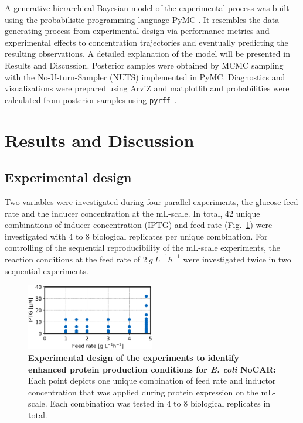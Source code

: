 \documentclass[sn-standardnature]{sn-jnl}%
\theoremstyle{thmstyleone}%
\theoremstyle{thmstyletwo}%
\theoremstyle{thmstylethree}%
\begin{document}
A generative hierarchical Bayesian model of the experimental process was built using the probabilistic programming language PyMC \cite{pymc3,pymcZenodo}.
It resembles the data generating process from experimental design via performance metrics and experimental effects to concentration trajectories and eventually predicting the resulting observations.
A detailed explanation of the model will be presented in Results and Discussion.
Posterior samples were obtained by MCMC sampling with the No-U-turn-Sampler (NUTS) implemented in PyMC.
Diagnostics and visualizations were prepared using ArviZ and matplotlib \cite{arviz,arvizPaper,matplotlib,matplotlibPaper} and probabilities were calculated from posterior samples using \texttt{pyrff}~\cite{pyrff}.



\section{Results and Discussion}
\label{sec_results}

\subsection{Experimental design}

Two variables were investigated during four parallel experiments, the glucose feed rate and the inducer concentration at the mL-scale.
In total, 42 unique combinations of inducer concentration (IPTG) and feed rate (Fig.~\ref{fig_expdesign}) were investigated with 4 to 8 biological replicates per unique combination.
For controlling of the sequential reproducibility of the mL-scale experiments, the reaction conditions at the feed rate of 
$2\ g\ L^{-1}h^{-1}$ were investigated twice in two sequential experiments.

\begin{figure}[h]
    \centering
    \includegraphics[width=0.5\textwidth]{figures/ExpDesign.png}
    \caption{
        \textbf{Experimental design of the experiments to identify enhanced protein production conditions for \textit{E. coli} NoCAR:}
        Each point depicts one unique combination of feed rate and inductor concentration that was applied during protein expression on the mL-scale.
        Each combination was tested in 4 to 8 biological replicates in total.
    }
    \label{fig_expdesign}
\end{figure}
\end{document}
